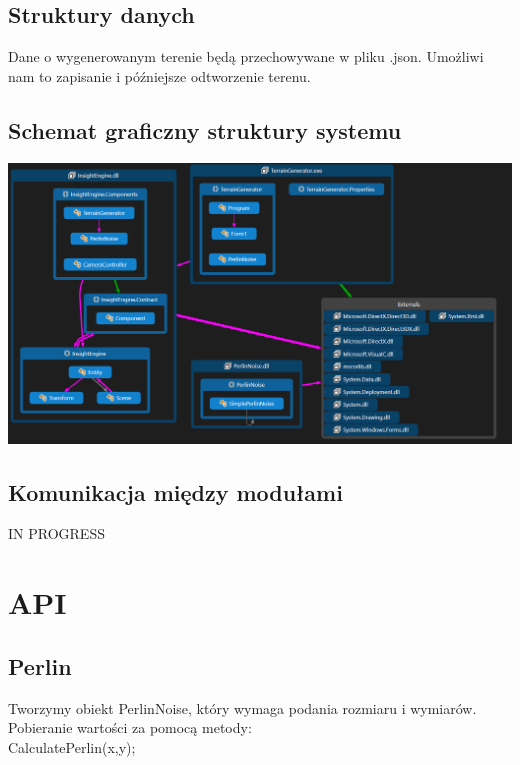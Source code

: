 \documentclass[12pt,a4paper]{article}
\begin{document}
\subsection{Struktury danych}
Dane o wygenerowanym terenie będą przechowywane w pliku .json. Umożliwi nam to zapisanie i późniejsze odtworzenie terenu.
\subsection{Schemat graficzny struktury systemu}
\includegraphics[width=1\textwidth]{images/klasy.png}
\subsection{Komunikacja między modułami}
IN PROGRESS
\section{API}
\subsection{Perlin}
Tworzymy obiekt PerlinNoise, który wymaga podania rozmiaru i wymiarów.
Pobieranie wartości za pomocą metody:\\
CalculatePerlin(x,y);
\end{document}

